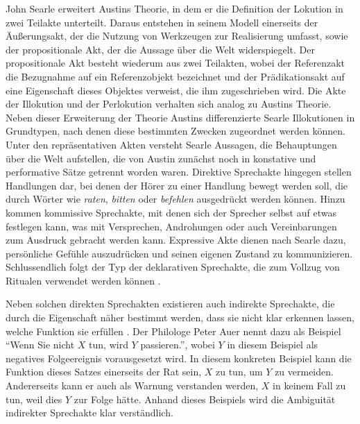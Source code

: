 John Searle erweitert Austins Theorie, in dem er die Definition der Lokution in zwei Teilakte unterteilt.
Daraus entstehen in seinem Modell einerseits der Äußerungsakt, der die Nutzung von Werkzeugen zur Realisierung umfasst, sowie der propositionale Akt, der die Aussage über die Welt widerspiegelt.
Der propositionale Akt besteht wiederum aus zwei Teilakten, wobei der Referenzakt die Bezugnahme auf ein Referenzobjekt bezeichnet und der Prädikationsakt auf eine Eigenschaft dieses Objektes verweist, die ihm zugeschrieben wird.
Die Akte der Illokution und der Perlokution verhalten sich analog zu Austins Theorie.
Neben dieser Erweiterung der Theorie Austins differenzierte Searle Illokutionen in Grundtypen, nach denen diese bestimmten Zwecken zugeordnet werden können.
Unter den repräsentativen Akten versteht Searle Aussagen, die Behauptungen über die Welt aufstellen, die von Austin zunächst noch in konstative und performative Sätze getrennt worden waren.
Direktive Sprechakte hingegen stellen Handlungen dar, bei denen der Hörer zu einer Handlung bewegt werden soll, die durch Wörter wie \emph{raten}, \emph{bitten} oder \emph{befehlen} ausgedrückt werden können.
Hinzu kommen kommissive Sprechakte, mit denen sich der Sprecher selbst auf etwas festlegen kann, was mit Versprechen, Androhungen oder auch Vereinbarungen zum Ausdruck gebracht werden kann.
Expressive Akte dienen nach Searle dazu, persönliche Gefühle auszudrücken und seinen eigenen Zustand zu kommunizieren.
Schlussendlich folgt der Typ der deklarativen Sprechakte, die zum Vollzug von Ritualen verwendet werden können \cite[S. 218]{AL04}.

Neben solchen direkten Sprechakten existieren auch indirekte Sprechakte, die durch die Eigenschaft näher bestimmt werden, dass sie nicht klar erkennen lassen, welche Funktion sie erfüllen \cite[S. 85]{PA99}.
Der Philologe Peter Auer nennt dazu als Beispiel "`Wenn Sie nicht $X$ tun, wird $Y$ passieren."', wobei $Y$ in diesem Beispiel als negatives Folgeereignis vorausgesetzt wird.
In diesem konkreten Beispiel kann die Funktion dieses Satzes einerseits der Rat sein, $X$ zu tun, um $Y$ zu vermeiden.
Andererseits kann er auch als Warnung verstanden werden, $X$ in keinem Fall zu tun, weil dies $Y$ zur Folge hätte.
Anhand dieses Beispiels wird die Ambiguität indirekter Sprechakte klar verständlich.

